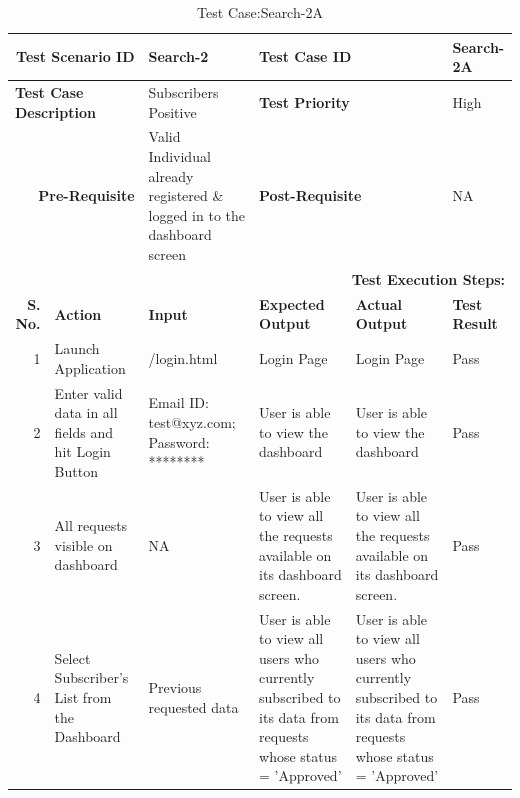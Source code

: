 \documentclass[a4paper, hidelinks, 12pt]{report}
\begin{document}
\begin{itemize}
\begin{table}[H]
  \centering
  \caption{Test Case:Search-2A}
    \begin{tabular}{|r|p{4.355em}|p{7.715em}|p{6.43em}|p{5.855em}|p{5.07em}|}
    \toprule
    \multicolumn{2}{|p{13.425em}|}{\textbf{Test Scenario ID}} & Search-2 & \multicolumn{2}{p{12.285em}|}{\textbf{Test Case ID}} & Search-2A \\
    \midrule
    \multicolumn{2}{|l|}{\multirow{2}[2]{*}{\textbf{Test Case Description}}} & \multirow{2}[2]{*}{Subscribers Positive} & \multicolumn{2}{l|}{\multirow{2}[2]{*}{\textbf{Test Priority}}} & \multirow{2}[2]{*}{High} \\
    \multicolumn{2}{|l|}{} & \multicolumn{1}{l|}{} & \multicolumn{2}{l|}{} & \multicolumn{1}{l|}{} \\
    \midrule
    \multicolumn{2}{|p{13.425em}|}{\textbf{Pre-Requisite}} & Valid Individual already registered \& logged in to the dashboard screen & \multicolumn{2}{p{12.285em}|}{\textbf{Post-Requisite}} & NA \\
    \midrule
    \multicolumn{6}{p{38.495em}|}{\textbf{Test Execution Steps:}} \\
    \midrule
    \multicolumn{1}{|p{5.07em}|}{\textbf{S. No.}} & \textbf{Action } & \textbf{Input} & \textbf{Expected Output} & \textbf{Actual Output} & \textbf{Test Result} \\
    \midrule
    1     & Launch Application & /login.html & Login Page & Login Page & Pass \\
    \midrule
    2     & Enter valid data in all fields and hit Login Button & Email ID: test@xyz.com; Password: ******** & User is able to view the dashboard & User is able to view the dashboard & Pass \\
    \midrule
    3     & All requests visible on dashboard & NA    & User is able to view all the requests available on its dashboard screen. & User is able to view all the requests available on its dashboard screen. & Pass \\
    \midrule
    4     & Select Subscriber's List from the Dashboard & Previous requested data & User is able to view all users who currently subscribed to its data from requests whose status = 'Approved' & User is able to view all users who currently subscribed to its data from requests whose status = 'Approved' & Pass \\
    \bottomrule
    \end{tabular}%
  \label{tab:Test Case:Search-2A}%
\end{table}%


\end{itemize}
\end{document}
